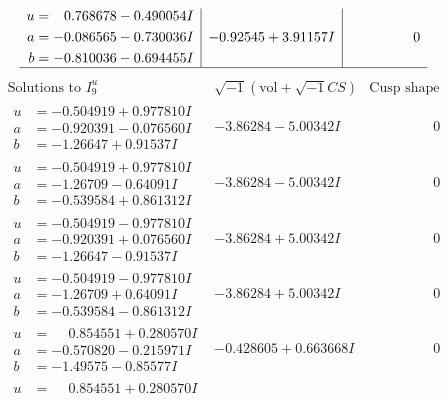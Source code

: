 \documentclass[1p]{elsarticle_modified}
\theoremstyle{definition}
\newcommand{\I}{\sqrt{-1}}
\begin{document}
$$\begin{array}{c|c|c}
\begin{aligned}
u &= \phantom{-}0.768678 - 0.490054 I \\
a &= -0.086565 - 0.730036 I \\
b &= -0.810036 - 0.694455 I\end{aligned}
 & -0.92545 + 3.91157 I & \phantom{-0.000000 } 0\\
 \hline 
 \end{array}$$\newpage$$\begin{array}{c|c|c}  
\text{Solutions to }I^u_{9}& \I (\text{vol} + \sqrt{-1}CS) & \text{Cusp shape}\\
 \hline 
\begin{aligned}
u &= -0.504919 + 0.977810 I \\
a &= -0.920391 - 0.076560 I \\
b &= -1.26647 + 0.91537 I\end{aligned}
 & -3.86284 - 5.00342 I & \phantom{-0.000000 } 0 \\ \hline\begin{aligned}
u &= -0.504919 + 0.977810 I \\
a &= -1.26709 - 0.64091 I \\
b &= -0.539584 + 0.861312 I\end{aligned}
 & -3.86284 - 5.00342 I & \phantom{-0.000000 } 0 \\ \hline\begin{aligned}
u &= -0.504919 - 0.977810 I \\
a &= -0.920391 + 0.076560 I \\
b &= -1.26647 - 0.91537 I\end{aligned}
 & -3.86284 + 5.00342 I & \phantom{-0.000000 } 0 \\ \hline\begin{aligned}
u &= -0.504919 - 0.977810 I \\
a &= -1.26709 + 0.64091 I \\
b &= -0.539584 - 0.861312 I\end{aligned}
 & -3.86284 + 5.00342 I & \phantom{-0.000000 } 0 \\ \hline\begin{aligned}
u &= \phantom{-}0.854551 + 0.280570 I \\
a &= -0.570820 - 0.215971 I \\
b &= -1.49575 - 0.85577 I\end{aligned}
 & -0.428605 + 0.663668 I & \phantom{-0.000000 } 0 \\ \hline\begin{aligned}
u &= \phantom{-}0.854551 + 0.280570 I \\

\end{aligned}
\end{array}$$
\end{document}
